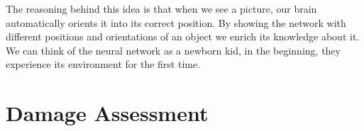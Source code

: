 The reasoning behind this idea is that when we see a picture, our brain automatically orients it into its correct position. By showing the network with different positions and orientations of an object we enrich its knowledge about it.\\

We can think of the neural network as a newborn kid, in the beginning, they experience its environment for the first time.\\



\section{Damage Assessment}


